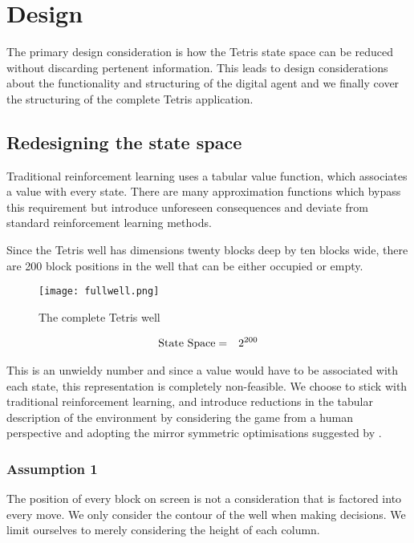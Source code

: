\documentclass{rucsthesis}
\begin{document}
\chapter{Design}

The primary design consideration is how the Tetris state space can be reduced without discarding pertenent information. This leads to design considerations about the functionality and structuring of the digital agent and we finally cover the structuring of the complete Tetris application.

\section{Redesigning the state space}

Traditional reinforcement learning uses a tabular value function, which associates a value with every state. There are many approximation functions which bypass this requirement but introduce unforeseen consequences and deviate from standard reinforcement learning methods.

Since the Tetris well has dimensions twenty blocks deep by ten blocks wide, there are 200 block positions in the well that can be either occupied or empty.

\begin{figure}[h]
\centering
\texttt{[image: fullwell.png]}
\caption{The complete Tetris well}
\label{fig:fullwell}
\end{figure}

\begin{eqnarray}
\centering
\textrm{State Space} & = & 2^{200} 
\end{eqnarray}

This is an unwieldy number and since a value would have to be associated with each state, this representation is completely non-feasible. We choose to stick with traditional reinforcement learning, and introduce reductions in the tabular description of the environment by considering the game from a human perspective and adopting the mirror symmetric optimisations suggested by \cite{yaeltetris}. 

\subsection*{Assumption 1}

The position of every block on screen is not a consideration that is factored into every move. We only consider the contour of the well when making decisions. We limit ourselves to merely considering the height of each column.
\end{document}
